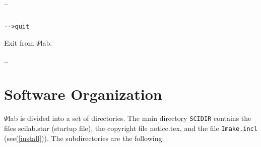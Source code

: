 \noindent.\dotfill.
\begin{verbatim}

-->quit

\end{verbatim}
Exit from $\Psi$lab.

\noindent.\dotfill.




\section{Software Organization}

$\Psi$lab is divided into a set of directories. The main directory
\verb!SCIDIR! contains the files scilab.star (startup file), the
copyright file notice.tex, and the file \verb!Imake.incl! (see(\ref{install})).
The subdirectories are the following:
